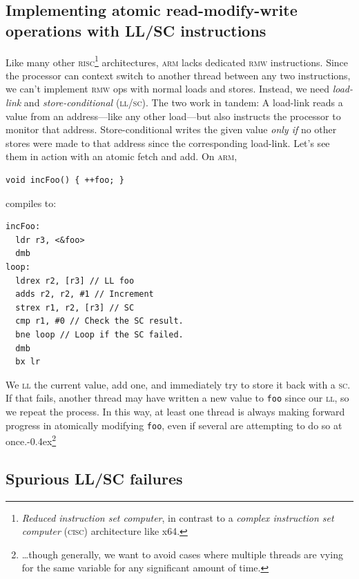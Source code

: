 \documentclass[fontsize=10pt, numbers=endperiod]{scrartcl}
\newcommand{\codesize}{\fontsize{10pt}{12pt}}
\newcommand{\punckern}{\kern-0.4ex}
\newcommand{\introduce}[1]{\textit{#1}}
\newenvironment{colfigure}
  {\par\vspace{1\baselineskip minus 0.5\baselineskip}\noindent\minipage{\linewidth}}
  {\endminipage\vspace*{1\baselineskip minus 0.7\baselineskip}}
\begin{document}
\begin{multicols*}{2}
\section{Implementing atomic read-modify-write operations with LL/SC instructions}

Like many other
\textsc{risc}\footnote{\introduce{Reduced instruction set computer},
in contrast to a \introduce{complex instruction set computer} \textsc{(cisc)}
architecture like x64.}
architectures, \textsc{arm} lacks dedicated \textsc{rmw} instructions.
Since the processor can context switch to another thread
between any two instructions,
we can't implement \textsc{rmw} ops with normal loads and stores.
Instead, we need
\introduce{load-link} and \introduce{store-conditional} \textsc{(ll/sc)}.
The two work in tandem:
A load-link reads a value from an address---like any other load---but also
instructs the processor to monitor that address.
Store-conditional writes the given value \emph{only if}
no other stores were made to that address
since the corresponding load-link.
Let's see them in action with an atomic fetch and add.
On \textsc{arm},
\begin{colfigure}
\begin{verbatim}
void incFoo() { ++foo; }
\end{verbatim}
compiles to:
\begin{lstlisting}[language={[ARM]Assembler}]
incFoo:
  ldr r3, <&foo>
  dmb
loop:
  ldrex r2, [r3] // LL foo
  adds r2, r2, #1 // Increment
  strex r1, r2, [r3] // SC
  cmp r1, #0 // Check the SC result.
  bne loop // Loop if the SC failed.
  dmb
  bx lr
\end{lstlisting}
\end{colfigure}
We \textsc{ll} the current value, add one, and immediately try to store it back
with a \textsc{sc}. If that fails, another thread may have
written a new value to \texttt{foo} since our \textsc{ll},
so we repeat the process.
In this way, at least one thread is always making forward progress in atomically
modifying \texttt{foo}, even if several are attempting to do so at
once.\punckern\footnote{\ldots though generally,
we want to avoid cases where multiple threads are vying for the same variable
for any significant amount of time.}

\subsection{Spurious LL/SC failures}
\label{spurious-ll/sc-failures}


\end{multicols*}
\end{document}
